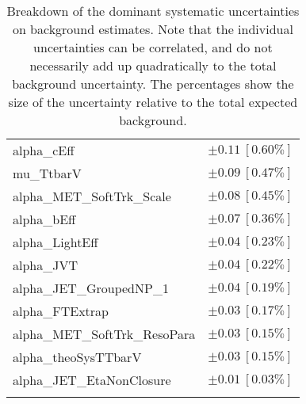\begin{table}
\begin{center}
\begin{tabular*}{\textwidth}{@{\extracolsep{\fill}}lc}
alpha\_cEff         & $\pm 0.11\ [0.60\%] $       \\
mu\_TtbarV         & $\pm 0.09\ [0.47\%] $       \\
alpha\_MET\_SoftTrk\_Scale         & $\pm 0.08\ [0.45\%] $       \\
alpha\_bEff         & $\pm 0.07\ [0.36\%] $       \\
alpha\_LightEff         & $\pm 0.04\ [0.23\%] $       \\
alpha\_JVT         & $\pm 0.04\ [0.22\%] $       \\
alpha\_JET\_GroupedNP\_1         & $\pm 0.04\ [0.19\%] $       \\
alpha\_FTExtrap         & $\pm 0.03\ [0.17\%] $       \\
alpha\_MET\_SoftTrk\_ResoPara         & $\pm 0.03\ [0.15\%] $       \\
alpha\_theoSysTTbarV         & $\pm 0.03\ [0.15\%] $       \\
alpha\_JET\_EtaNonClosure         & $\pm 0.01\ [0.03\%] $       \\
\noalign{\smallskip}\hline\noalign{\smallskip}
\end{tabular*}
\end{center}
\caption[Breakdown of uncertainty on background estimates]{
Breakdown of the dominant systematic uncertainties on background estimates.
Note that the individual uncertainties can be correlated, and do not necessarily add up quadratically to 
the total background uncertainty. The percentages show the size of the uncertainty relative to the total expected background.
\label{table.results.bkgestimate.uncertainties.SRC3}}
\end{table}
%